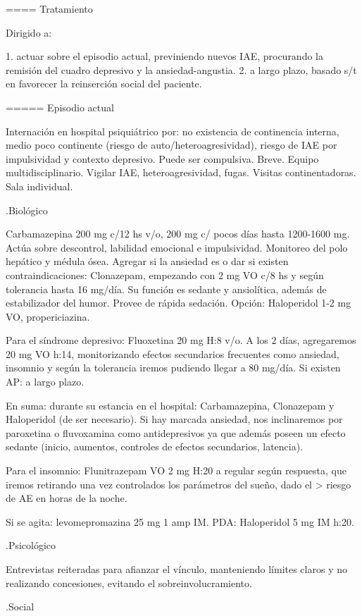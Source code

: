 \documentclass[encares.tex]{subfiles}
\begin{document}
==== Tratamiento

Dirigido a:

1. actuar sobre el episodio actual, previniendo nuevos IAE, procurando la remisión del cuadro depresivo y la ansiedad-angustia.
2. a largo plazo, basado s/t en favorecer la reinserción social del paciente.

===== Episodio actual

Internación en hospital psiquiátrico por: no existencia de continencia interna, medio poco continente (riesgo de auto/heteroagresividad), riesgo de IAE por impulsividad y contexto depresivo. Puede ser compulsiva. Breve. Equipo multidisciplinario. Vigilar IAE, heteroagresividad, fugas. Visitas continentadoras. Sala individual.

.Biológico

Carbamazepina 200 mg c/12 hs v/o, 200 mg c/ pocos días hasta 1200-1600 mg. Actúa sobre descontrol, labilidad emocional e impulsividad. Monitoreo del polo hepático y médula ósea. Agregar si la ansiedad es o dar si existen contraindicaciones: Clonazepam, empezando con 2 mg VO c/8 hs y según tolerancia hasta 16 mg/día. Su función es sedante y ansiolítica, además de estabilizador del humor. Provee de rápida sedación. Opción: Haloperidol 1-2 mg VO, propericiazina.

Para el síndrome depresivo: Fluoxetina 20 mg H:8 v/o. A los 2 días, agregaremos 20 mg VO h:14, monitorizando efectos secundarios frecuentes como ansiedad, insomnio y según la tolerancia iremos pudiendo llegar a 80 mg/día. Si existen AP: a largo plazo.

En suma: durante su estancia en el hospital: Carbamazepina, Clonazepam y Haloperidol (de ser necesario). Si hay marcada ansiedad, nos inclinaremos por paroxetina o fluvoxamina como antidepresivos ya que además poseen un efecto sedante (inicio, aumentos, controles de efectos secundarios, latencia).

Para el insomnio: Flunitrazepam VO 2 mg H:20 a regular según respuesta, que iremos retirando una vez controlados los parámetros del sueño, dado el > riesgo de AE en horas de la noche.

Si se agita: levomepromazina 25 mg 1 amp IM. PDA: Haloperidol 5 mg IM h:20.

.Psicológico

Entrevistas reiteradas para afianzar el vínculo, manteniendo límites claros y no realizando concesiones, evitando el sobreinvolucramiento.

.Social
\end{document}
